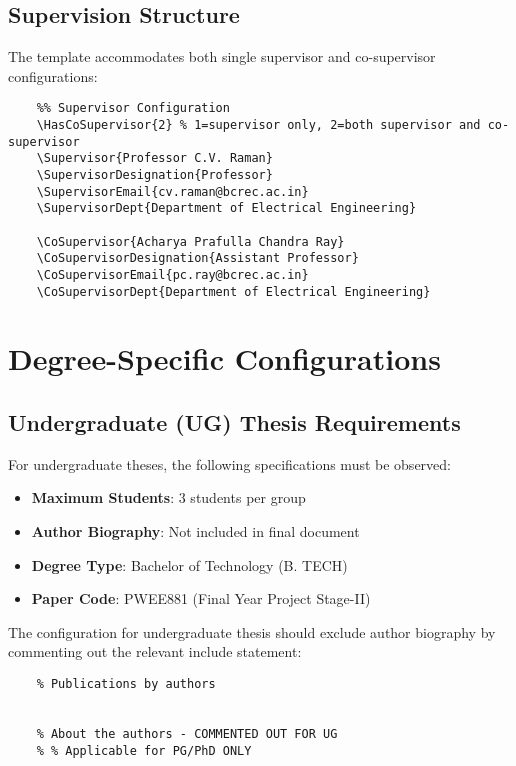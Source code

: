 \subsection{Supervision Structure}
\label{subsec:supervision}

The template accommodates both single supervisor and co-supervisor configurations:

\begin{verbatim}
	%% Supervisor Configuration
	\HasCoSupervisor{2} % 1=supervisor only, 2=both supervisor and co-supervisor
	\Supervisor{Professor C.V. Raman}
	\SupervisorDesignation{Professor}
	\SupervisorEmail{cv.raman@bcrec.ac.in}
	\SupervisorDept{Department of Electrical Engineering}
	
	\CoSupervisor{Acharya Prafulla Chandra Ray}
	\CoSupervisorDesignation{Assistant Professor}
	\CoSupervisorEmail{pc.ray@bcrec.ac.in}
	\CoSupervisorDept{Department of Electrical Engineering}
\end{verbatim}

\section{Degree-Specific Configurations}
\label{sec:degree_config}

\subsection{Undergraduate (UG) Thesis Requirements}
\label{subsec:ug_requirements}

For undergraduate theses, the following specifications must be observed:

\begin{itemize}
	\item \textbf{Maximum Students}: 3 students per group
	\item \textbf{Author Biography}: Not included in final document
	\item \textbf{Degree Type}: Bachelor of Technology (B. TECH)
	\item \textbf{Paper Code}: PWEE881 (Final Year Project Stage-II)
\end{itemize}

The configuration for undergraduate thesis should exclude author biography by commenting out the relevant include statement:

\begin{verbatim}
	% Publications by authors
	
	
	% About the authors - COMMENTED OUT FOR UG
	% % Applicable for PG/PhD ONLY
\end{verbatim}

